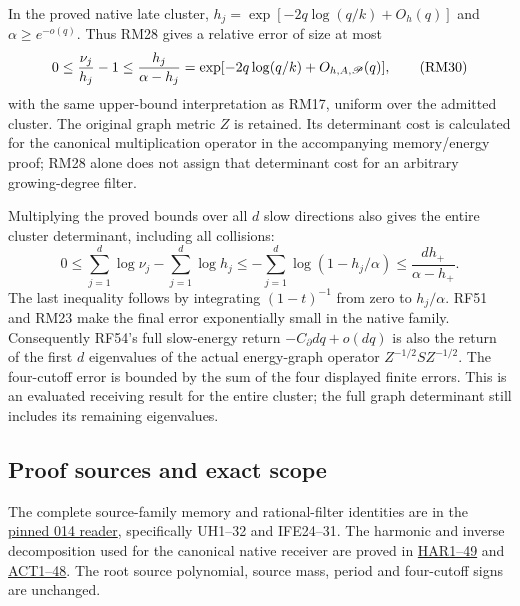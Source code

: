\documentclass[11pt]{article}
\begin{document}
In the proved native late cluster, \(h_j=\exp[-2q\log(q/k)+O_h(q)]\) and \(\alpha\ge e^{-o(q)}\). Thus RM28 gives a relative error of size at most \[
0\le {\nu_j\over h_j}-1
\le {h_j\over\alpha-h_j}
=\exp[-2q\log(q/k)+O_{h,A,\mathscr P}(q)],
\tag{RM30}
\] with the same upper-bound interpretation as RM17, uniform over the admitted cluster. The original graph metric \(Z\) is retained. Its determinant cost is calculated for the canonical multiplication operator in the accompanying memory/energy proof; RM28 alone does not assign that determinant cost for an arbitrary growing-degree filter.

Multiplying the proved bounds over all \(d\) slow directions also gives the entire cluster determinant, including all collisions: \[
0\le\sum_{j=1}^d\log\nu_j-\sum_{j=1}^d\log h_j
\le-\sum_{j=1}^d\log(1-h_j/\alpha)
\le\frac{d h_+}{\alpha-h_+}.
\tag{RM31}
\] The last inequality follows by integrating \((1-t)^{-1}\) from zero to \(h_j/\alpha\). RF51 and RM23 make the final error exponentially small in the native family. Consequently RF54's full slow-energy return \(-C_\partial dq+o(dq)\) is also the return of the first \(d\) eigenvalues of the actual energy-graph operator \(Z^{-1/2}SZ^{-1/2}\). The four-cutoff error is bounded by the sum of the four displayed finite errors. This is an evaluated receiving result for the entire cluster; the full graph determinant still includes its remaining eigenvalues.

\subsection{Proof sources and exact scope}\label{proof-sources-and-exact-scope}

The complete source-family memory and rational-filter identities are in the \href{https://github.com/KokunoYumeto/zeta-function-research-reader/blob/f1ad8be11f329a12d562420edfa58fa464948ee2/workbenches/splitzero-tandem/continuations/20260921-uniform-source-family/UNIFORM_SOURCE_FAMILY_COMPLETE_READER.tex}{pinned 014 reader}, specifically UH1--32 and IFE24--31. The harmonic and inverse decomposition used for the canonical native receiver are proved in \href{https://github.com/KokunoYumeto/zeta-function-research-reader/blob/360d3c1d798da434966d35f7e407fc59c14f234b/workbenches/splitzero-tandem/continuations/20260921-critical-inverse-activation/HARMONIC_PROOFS.md}{HAR1--49} and \href{https://github.com/KokunoYumeto/zeta-function-research-reader/blob/360d3c1d798da434966d35f7e407fc59c14f234b/workbenches/splitzero-tandem/continuations/20260921-critical-inverse-activation/ACTION_PROOFS.md}{ACT1--48}. The root source polynomial, source mass, period and four-cutoff signs are unchanged.
\end{document}
